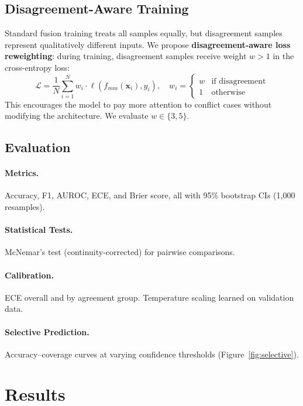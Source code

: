 \documentclass[11pt,a4paper]{article}
\begin{document}
\subsection{Disagreement-Aware Training}

Standard fusion training treats all samples equally, but disagreement samples represent qualitatively different inputs.
We propose \textbf{disagreement-aware loss reweighting}: during training, disagreement samples receive weight $w > 1$ in the cross-entropy loss:
\begin{equation}
  \mathcal{L} = \frac{1}{N} \sum_{i=1}^{N} w_i \cdot \ell(f_{mm}(\mathbf{x}_i), y_i), \quad w_i = \begin{cases} w & \text{if disagreement} \\ 1 & \text{otherwise} \end{cases}
\end{equation}
This encourages the model to pay more attention to conflict cases without modifying the architecture.
We evaluate $w \in \{3, 5\}$.

\subsection{Evaluation}

\paragraph{Metrics.}
Accuracy, F1, AUROC, ECE, and Brier score, all with 95\% bootstrap CIs (1{,}000 resamples).

\paragraph{Statistical Tests.}
McNemar's test (continuity-corrected) for pairwise comparisons.

\paragraph{Calibration.}
ECE overall and by agreement group.
Temperature scaling learned on validation data.

\paragraph{Selective Prediction.}
Accuracy--coverage curves at varying confidence thresholds (Figure~\ref{fig:selective}).

\section{Results}
\end{document}
